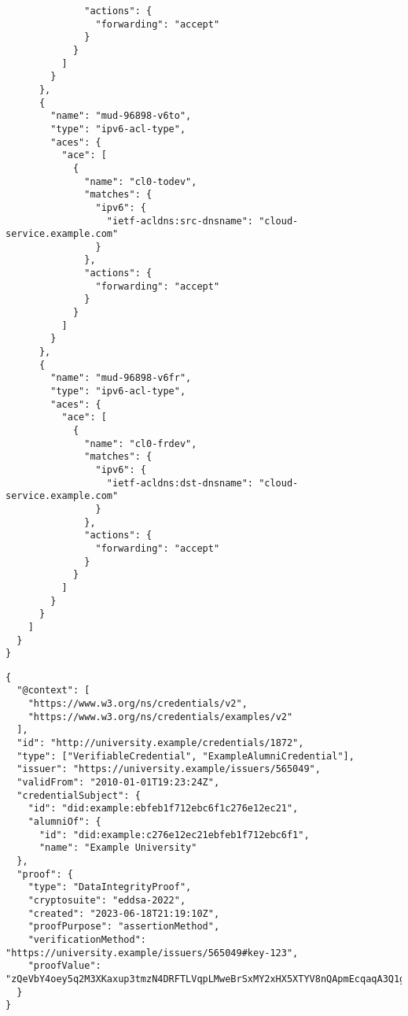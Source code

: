 \begin{verbatim}
              "actions": {
                "forwarding": "accept"
              }
            }
          ]
        }
      },
      {
        "name": "mud-96898-v6to",
        "type": "ipv6-acl-type",
        "aces": {
          "ace": [
            {
              "name": "cl0-todev",
              "matches": {
                "ipv6": {
                  "ietf-acldns:src-dnsname": "cloud-service.example.com"
                }
              },
              "actions": {
                "forwarding": "accept"
              }
            }
          ]
        }
      },
      {
        "name": "mud-96898-v6fr",
        "type": "ipv6-acl-type",
        "aces": {
          "ace": [
            {
              "name": "cl0-frdev",
              "matches": {
                "ipv6": {
                  "ietf-acldns:dst-dnsname": "cloud-service.example.com"
                }
              },
              "actions": {
                "forwarding": "accept"
              }
            }
          ]
        }
      }
    ]
  }
}
\end{verbatim}


\label{code:vc-doc}
\begin{verbatim}
{
  "@context": [
    "https://www.w3.org/ns/credentials/v2",
    "https://www.w3.org/ns/credentials/examples/v2"
  ],
  "id": "http://university.example/credentials/1872",
  "type": ["VerifiableCredential", "ExampleAlumniCredential"],
  "issuer": "https://university.example/issuers/565049",
  "validFrom": "2010-01-01T19:23:24Z",
  "credentialSubject": {
    "id": "did:example:ebfeb1f712ebc6f1c276e12ec21",
    "alumniOf": {
      "id": "did:example:c276e12ec21ebfeb1f712ebc6f1",
      "name": "Example University"
  },
  "proof": {
    "type": "DataIntegrityProof",
    "cryptosuite": "eddsa-2022",
    "created": "2023-06-18T21:19:10Z",
    "proofPurpose": "assertionMethod",
    "verificationMethod": "https://university.example/issuers/565049#key-123",
    "proofValue": "zQeVbY4oey5q2M3XKaxup3tmzN4DRFTLVqpLMweBrSxMY2xHX5XTYV8nQApmEcqaqA3Q1gVHMrXFkXJeV6doDwLWx"
  }
}
\end{verbatim}

